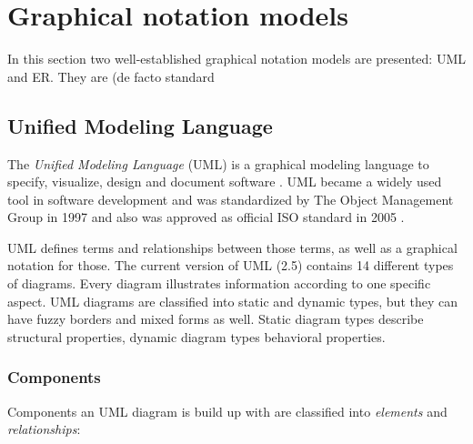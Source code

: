 \documentclass[twoside, openright, 12pt]{book}
\begin{document}
\section{Graphical notation models}
\label{graphical_notations}
In this section two well-established graphical notation models are presented: UML and ER.
They are (de facto standard

\subsection{Unified Modeling Language}
\label{UML}
The \textit{Unified Modeling Language} (UML) is a graphical modeling language to specify, visualize, design and document software \citep{UML_OMG}.
UML became a widely used tool in software development and was standardized by The Object Management Group in 1997 and also was approved as official ISO standard in 2005 \citep{UML_ISO}.

UML defines terms and relationships between those terms, as well as a graphical notation for those.
The current version of UML (2.5) contains 14 different types of diagrams.
Every diagram illustrates information according to one specific aspect.
UML diagrams are classified into static and dynamic types, but they can have fuzzy borders and mixed forms as well.
Static diagram types describe structural properties, dynamic diagram types behavioral properties.



\subsubsection{Components}
Components an UML diagram is build up with are classified into \textit{elements} and \textit{relationships}:
\end{document}
